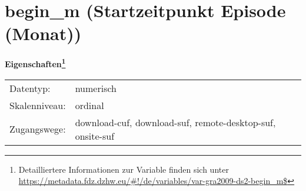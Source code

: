 
    \setcounter{footnote}{0}

    \vspace*{-1.8cm}
	\section{begin\_m (Startzeitpunkt Episode (Monat))}
	\label{section:begin_m}



    \vspace*{0.5cm}
    \noindent\textbf{Eigenschaften\footnote{Detailliertere Informationen zur Variable finden sich unter
		\url{https://metadata.fdz.dzhw.eu/\#!/de/variables/var-gra2009-ds2-begin_m$}}}\\
	\begin{tabularx}{\hsize}{@{}lX}
	Datentyp: & numerisch \\
	Skalenniveau: & ordinal \\
	Zugangswege: &
	  download-cuf, 
	  download-suf, 
	  remote-desktop-suf, 
	  onsite-suf
 \\
    \end{tabularx}



